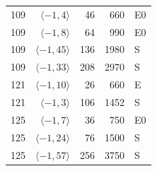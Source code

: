 \begin{longtable}{rrrrl}
109 & $\langle -1, 4\rangle$ & 46 & 660 & E0 \\
109 & $\langle -1, 8\rangle$ & 64 & 990 & E0 \\
109 & $\langle -1, 45\rangle$ & 136 & 1980 & S \\
109 & $\langle -1, 33\rangle$ & 208 & 2970 & S \\
121 & $\langle -1, 10\rangle$ & 26 & 660 & E \\
121 & $\langle -1, 3\rangle$ & 106 & 1452 & S \\
125 & $\langle -1, 7\rangle$ & 36 & 750 & E0 \\
125 & $\langle -1, 24\rangle$ & 76 & 1500 & S \\
125 & $\langle -1, 57\rangle$ & 256 & 3750 & S \\
\bottomrule
\end{longtable}
